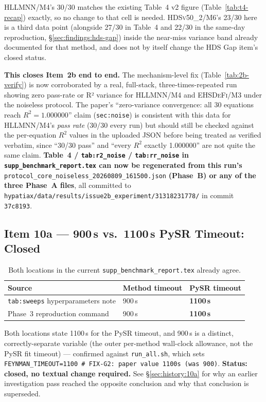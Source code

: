 \documentclass[twoside,11pt]{article}
\newcommand{\EHD}{\textsc{EHSDeFi}}
\newcommand{\HSL}{\textsc{HLLMNN}}
\newcommand{\HDS}{\textsc{HDSv50\_2}}
\newcommand{\Rsq}{R^{2}}
\begin{document}
\HSL{}/M4's 30/30 matches the existing Table~4 v2 figure
(Table~\ref{tab:t4-recap}) exactly, so no change to that cell is
needed. \HDS{}/M6's 23/30 here is a third data point (alongside 27/30
in Table~4 and 22/30 in the same-day reproduction,
\S\ref{sec:findings:hds-gap}) inside the near-miss variance band
already documented for that method, and does not by itself change the
HDS Gap item's closed status.

\textbf{This closes Item~2b end to end.} The mechanism-level fix
(Table~\ref{tab:2b-verify}) is now corroborated by a real, full-stack,
three-times-repeated run showing zero pass-rate or R² variance for
\HSL{}/M4 and \EHD{}/M3 under the noiseless protocol. The paper's
``zero-variance convergence: all 30 equations reach $\Rsq=1.000000$''
claim (\texttt{sec:noise}) is consistent with this data for \HSL{}/M4's
\emph{pass rate} (30/30 every run) but should still be checked against
the per-equation $\Rsq$ values in the uploaded JSON before being
treated as verified verbatim, since ``30/30 pass'' and ``every $\Rsq$
exactly 1.000000'' are not quite the same claim. \textbf{Table~4 /
\texttt{tab:r2\_noise} / \texttt{tab:rr\_noise} in
\texttt{supp\_benchmark\_report.tex} can now be regenerated from this
run's} \texttt{protocol\_core\_noiseless\_20260809\_161500.json}
\textbf{(Phase~B) or any of the three Phase~A files}, all committed to
\texttt{hypatiax/data/results/issue2b\_experiment/31318231778/} in
commit \texttt{37c8193}.

\subsection{Item 10a --- 900\,s vs.\ 1100\,s PySR Timeout: Closed}
\label{sec:findings:item10a}

\begin{table}[h]
\centering
\caption{Both locations in the current \texttt{supp\_benchmark\_report.tex}
  already agree.}
\label{tab:10a}
\small
\begin{tabular}{L{4.5cm} L{3.0cm} L{3.0cm}}
\toprule
\textbf{Source} & \textbf{Method timeout} & \textbf{PySR timeout} \\
\midrule
\texttt{tab:sweeps} hyperparameters note & 900\,s & \textbf{1100\,s} \\
Phase~3 reproduction command & 900\,s & \textbf{1100\,s} \\
\bottomrule
\end{tabular}
\end{table}

Both locations state 1100\,s for the PySR timeout, and 900\,s is a
distinct, correctly-separate variable (the outer per-method wall-clock
allowance, not the PySR fit timeout) --- confirmed against
\texttt{run\_all.sh}, which sets
\texttt{FEYNMAN\_TIMEOUT=1100 \# FIX-G2: paper value 1100s (was 900)}.
\textbf{Status: closed, no textual change required.} See
\S\ref{sec:history:10a} for why an earlier investigation pass reached
the opposite conclusion and why that conclusion is superseded.
\end{document}
